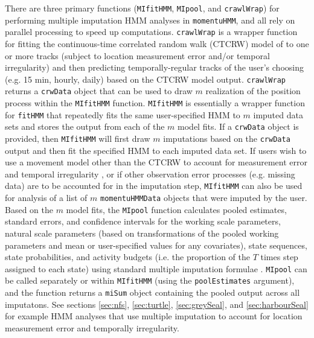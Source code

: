 \documentclass[12pt]{article}\usepackage[]{graphicx}\usepackage[]{color}
\begin{document}
There are three primary functions (\verb|MIfitHMM|, \verb|MIpool|, and \verb|crawlWrap|) for performing multiple imputation HMM analyses in \verb|momentuHMM|, and all rely on parallel processing to speed up computations. \verb|crawlWrap| is a wrapper function for fitting the continuous-time correlated random walk (CTCRW) model of \cite{JohnsonEtAl2008} to one or more tracks (subject to location measurement error and/or temporal irregularity) and then predicting temporally-regular tracks of the user's choosing (e.g. 15 min, hourly, daily) based on the CTCRW model output.  \verb|crawlWrap| returns a \verb|crwData| object that can be used to draw $m$ realization of the position process within the \verb|MIfitHMM| function.  \verb|MIfitHMM| is essentially a wrapper function for \verb|fitHMM| that repeatedly fits the same user-specified HMM to $m$ imputed data sets and stores the output from each of the $m$ model fits. If a \verb|crwData| object is provided, then \verb|MIfitHMM| will first draw $m$ imputations based on the \verb|crwData| output and then fit the specified HMM to each imputed data set. If users wish to use a movement model other than the CTCRW to account for measurement error and temporal irregularity \citep[e.g.][]{CalabreseEtAl2016,GurarieEtAl2017}, or if other observation error processes (e.g. missing data) are to be accounted for in the imputation step, \verb|MIfitHMM| can also be used for analysis of a list of $m$ \verb|momentuHMMData| objects that were imputed by the user. Based on the $m$ model fits, the \verb|MIpool| function calculates pooled estimates, standard errors, and confidence intervals for the working scale parameters, natural scale parameters (based on transformations of the pooled working parameters and mean or user-specified values for any covariates), state sequences, state probabilities, and activity budgets (i.e. the proportion of the $T$ times step assigned to each state) using standard multiple imputation formulae \citep{RubinSchenker1986,McClintock2017}.  \verb|MIpool| can be called separately or within \verb|MIfitHMM| (using the \verb|poolEstimates| argument), and the function returns a \verb|miSum| object containing the pooled output across all imputatons. See sections \ref{sec:nfs}, \ref{sec:turtle}, \ref{sec:greySeal}, and \ref{sec:harbourSeal} for example HMM analyses that use multiple imputation to account for location measurement error and temporally irregularity.
\end{document}

